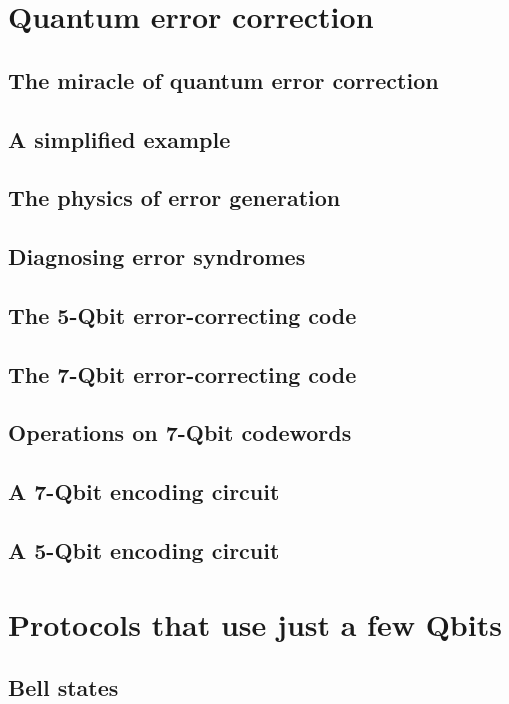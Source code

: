 \documentclass{book}
\theoremstyle{definition}
\begin{document}
\newpage

\section{Quantum error correction}

\subsection{The miracle of quantum error correction}
\subsection{A simplified example}
\subsection{The physics of error generation}
\subsection{Diagnosing error syndromes}
\subsection{The 5-Qbit error-correcting code}
\subsection{The 7-Qbit error-correcting code}
\subsection{Operations on 7-Qbit codewords}
\subsection{A 7-Qbit encoding circuit}
\subsection{A 5-Qbit encoding circuit}

\newpage

\section{Protocols that use just a few Qbits}

\subsection{Bell states}
\end{document}
